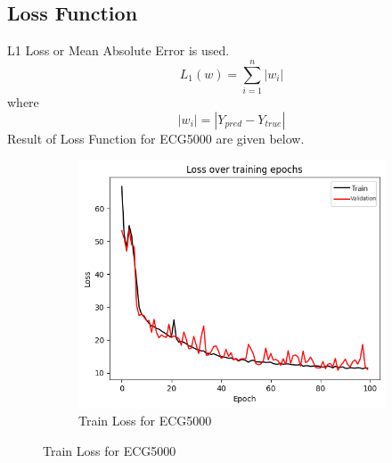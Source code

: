 \documentclass[nonacm,sigconf]{acmart}
\begin{document}
\subsection{Loss Function}
L1 Loss or Mean Absolute Error is used.
\[
L_1(w) = \sum_{i=1}^{n} |w_i|
\] where
\[
|w_i| = |Y_{pred}-Y_{true}|\]
Result of Loss Function for ECG5000 are given below.
\begin{figure}[ht]
    \centering

    \begin{subfigure}[b]{0.33\textwidth}
        \centering
        \includegraphics[width=\textwidth]{ecg5000/trainloss.png} %
        \caption{Train Loss for ECG5000}
        \label{fig:first_image}
    \end{subfigure}

    \vspace{1em} %


\end{figure}
\end{document}
